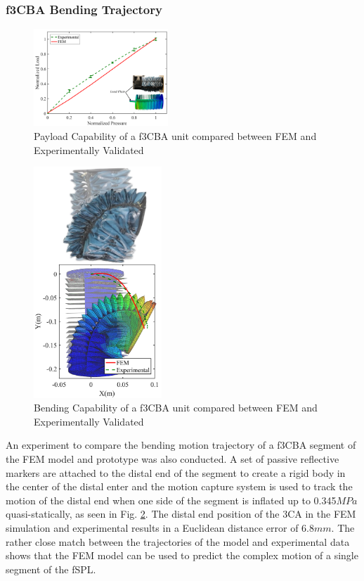 \documentclass[letterpaper, 10 pt, conference]{ieeeconf}  %
\begin{document}
\subsubsection{f3CBA Bending Trajectory}

\begin{figure}[b!]
\centering
\includegraphics[width=0.45\textwidth]{Figures/3CA_instron}
\caption{Payload Capability of a f3CBA unit compared between FEM and Experimentally Validated}
\label{fig:f3CAs_load_fem_real}
\vspace{-1.5em}
\end{figure}


\begin{figure}[t!]
\centering
\includegraphics[width=0.43\textwidth]{Figures/3CA_bend_FEM_REAL_v2}
\caption{Bending Capability of a f3CBA unit compared between FEM and Experimentally Validated}
\label{fig:f3CAs_bend_fem_real}
\vspace{-1.5em}
\end{figure}


An experiment to compare the bending motion trajectory of a f3CBA segment of the FEM model and prototype was also conducted. A set of passive reflective markers are attached to the distal end of the segment to create a rigid body in the center of the distal enter and the motion capture system is used to track the motion of the distal end when one side of the segment is inflated up to 0.345$MPa$ quasi-statically, as seen in Fig. \ref{fig:f3CAs_bend_fem_real}. The distal end position of the 3CA in the FEM simulation and experimental results in a Euclidean distance error of 6.8$mm$. The rather close match between the trajectories of the model and experimental data shows that the FEM model can be used to predict the complex motion of a single segment of the fSPL.
\end{document}
